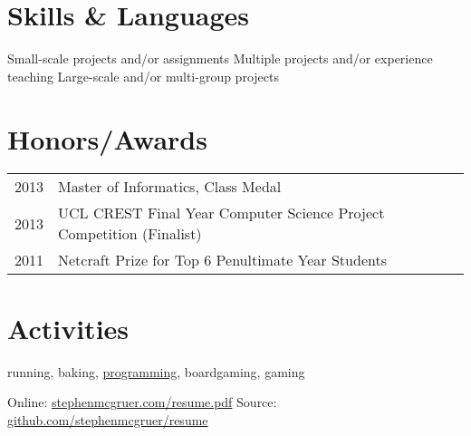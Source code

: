 \documentclass[10pt]{article}
\begin{document}

\vspace{-1em}
\section{Skills \& Languages}
\vspace{-1em}

\begin{multicols}{3}
\raggedcolumns

\begin{itemize}

\renewcommand{\labelitemi}{}

\renewcommand{\skill}{\textnormal}

\setlength{\itemsep}{1pt}
\setlength{\parskip}{0pt}
\setlength{\parsep}{0pt}

\skills{\bash}{\twoskill}
\skills{\ccpp}{\threeskill}
\skills{\git}{\twoskill}
\skills{\java}{\twoskill}
\skills{\js}{\oneskill}
\skills{\LaTeX}{\oneskill}
\skills{\python}{\twoskill}

\end{itemize}

\end{multicols}
\vspace{-1em}
  \begin{footnotesize}
    \oneskill Small-scale projects and/or assignments \hfill 
    \twoskill Multiple projects and/or experience teaching \hfill
    \threeskill Large-scale and/or multi-group projects
  \end{footnotesize}


\vspace{0.75em}
\section{Honors/Awards}
\begin{tabularx}{\textwidth}{r|X}
2013 & Master of Informatics, Class Medal \\
2013 & UCL CREST Final Year Computer Science Project Competition (Finalist) \\
2011 & Netcraft Prize for Top 6 Penultimate Year Students \\
\end{tabularx}


\vspace{0.75em}
\section{Activities}
running, baking, \href{https://github.com/stephenmcgruer}{programming}, boardgaming, gaming


\null\vfill
\footnotesize{
  Online:  \href{http://www.stephenmcgruer.com/resume.pdf}{stephenmcgruer.com/resume.pdf} \hfill
  Source:  \href{https://github.com/stephenmcgruer/resume}{github.com/stephenmcgruer/resume}
}
\end{document}
